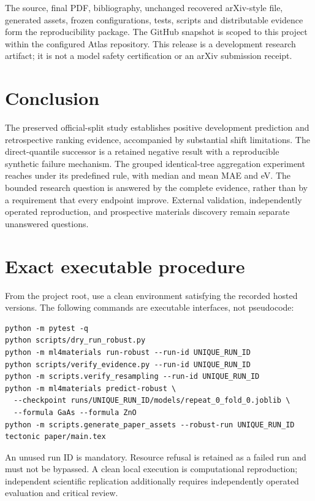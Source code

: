 \documentclass[11pt]{article}
\begin{document}
The source, final PDF, bibliography, unchanged recovered arXiv-style file, generated assets, frozen configurations, tests, scripts and distributable evidence form the reproducibility package. The GitHub snapshot is scoped to this project within the configured Atlas repository. This release is a development research artifact; it is not a model safety certification or an arXiv submission receipt.

\section{Conclusion}
The preserved official-split study establishes positive development prediction and retrospective ranking evidence, accompanied by substantial shift limitations. The direct-quantile successor is a retained negative result with a reproducible synthetic failure mechanism. The grouped identical-tree aggregation experiment reaches \textbf{\VThreeDisposition{}} under its predefined rule, with median and mean MAE \VThreeMedian{} and \VThreeMean{} eV. The bounded research question is answered by the complete evidence, rather than by a requirement that every endpoint improve. External validation, independently operated reproduction, and prospective materials discovery remain separate unanswered questions.

\appendix
\section{Exact executable procedure}
From the project root, use a clean environment satisfying the recorded hosted versions. The following commands are executable interfaces, not pseudocode:
\begin{verbatim}
python -m pytest -q
python scripts/dry_run_robust.py
python -m ml4materials run-robust --run-id UNIQUE_RUN_ID
python scripts/verify_evidence.py --run-id UNIQUE_RUN_ID
python -m scripts.verify_resampling --run-id UNIQUE_RUN_ID
python -m ml4materials predict-robust \
  --checkpoint runs/UNIQUE_RUN_ID/models/repeat_0_fold_0.joblib \
  --formula GaAs --formula ZnO
python -m scripts.generate_paper_assets --robust-run UNIQUE_RUN_ID
tectonic paper/main.tex
\end{verbatim}
An unused run ID is mandatory. Resource refusal is retained as a failed run and must not be bypassed. A clean local execution is computational reproduction; independent scientific replication additionally requires independently operated evaluation and critical review.
\end{document}
